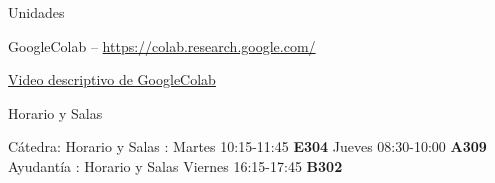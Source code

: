 \documentclass{beamer}
\begin{document}
\begin{frame}{Unidades}
{ GoogleColab -- \url{https://colab.research.google.com/}
 
  \href{https://www.youtube.com/watch?v=8VFYs3Ot_aA&t=115s}{Video descriptivo de GoogleColab}

}



  \end{frame}
  \begin{frame}{Horario y Salas}
  \begin{outline}
  \1 Cátedra: Horario y Salas :
  \2 Martes 10:15-11:45 \textbf{E304}
  \2 Jueves  08:30-10:00 \textbf{A309}
  \1 Ayudantía : Horario y Salas
  \2 Viernes 16:15-17:45 \textbf{B302}
   \end{outline}
  \end{frame}
  
\end{document}
